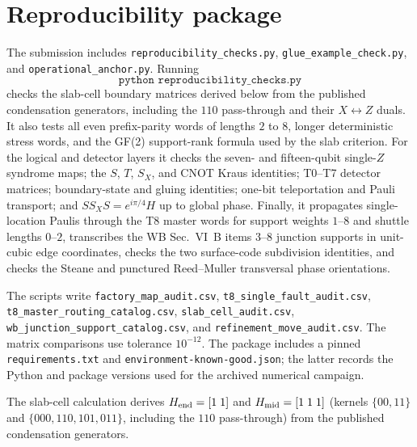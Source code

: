 \documentclass[aps,prx,reprint,superscriptaddress,nofootinbib,floatfix,longbibliography]{revtex4-2}
\theoremstyle{definition}
\begin{document}
\section{Reproducibility package}\label{sec:repro}

The submission includes \texttt{reproducibility\_checks.py}, \texttt{glue\_example\_check.py}, and \texttt{operational\_anchor.py}.  Running
\begin{equation*}
\texttt{python reproducibility\_checks.py}
\end{equation*}
checks the slab-cell boundary matrices derived below from the published condensation generators, including the $110$ pass-through and their $X\leftrightarrow Z$ duals.  It also tests all even prefix-parity words of lengths $2$ to $8$, longer deterministic stress words, and the GF(2) support-rank formula used by the slab criterion.  For the logical and detector layers it checks the seven- and fifteen-qubit single-$Z$ syndrome maps; the $S$, $T$, $S_X$, and CNOT Kraus identities; T0--T7 detector matrices; boundary-state and gluing identities; one-bit teleportation and Pauli transport; and $SS_XS=e^{i\pi/4}H$ up to global phase.  Finally, it propagates single-location Paulis through the T8 master words for support weights $1$--$8$ and shuttle lengths $0$--$2$, transcribes the WB Sec.~VI~B items 3--8 junction supports in unit-cubic edge coordinates, checks the two surface-code subdivision identities, and checks the Steane and punctured Reed--Muller transversal phase orientations.

The scripts write \nolinkurl{factory_map_audit.csv}, \nolinkurl{t8_single_fault_audit.csv}, \nolinkurl{t8_master_routing_catalog.csv}, \nolinkurl{slab_cell_audit.csv}, \nolinkurl{wb_junction_support_catalog.csv}, and \nolinkurl{refinement_move_audit.csv}.  The matrix comparisons use tolerance $10^{-12}$.  The package includes a pinned \nolinkurl{requirements.txt} and \nolinkurl{environment-known-good.json}; the latter records the Python and package versions used for the archived numerical campaign.

The slab-cell calculation derives $H_{\rm end}=[1\;1]$ and $H_{\rm mid}=[1\;1\;1]$ (kernels $\{00,11\}$ and $\{000,110,101,011\}$, including the $110$ pass-through) from the published condensation generators.
\end{document}

